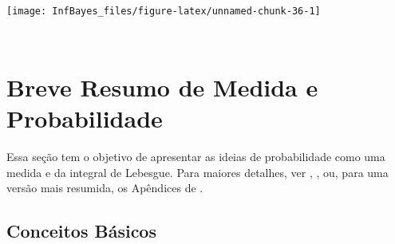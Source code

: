 \documentclass[
]{book}
\begin{document}
\begin{center}\texttt{[image: InfBayes\_files/figure-latex/unnamed-chunk-36-1]} \end{center}

\(~\)

\(~\)

\hypertarget{appendix-apuxeandice}{%
\appendix}


\hypertarget{medprob}{%
\chapter{Breve Resumo de Medida e Probabilidade}\label{medprob}}

Essa seção tem o objetivo de apresentar as ideias de probabilidade como uma medida e da integral de Lebesgue. Para maiores detalhes, ver \citet{Ash00}, \citet{Billingsley86}, \citet{Shiryaev96} ou, para uma versão mais resumida, os Apêndices de \citet{Schervish12}.

\hypertarget{basprob}{%
\section{Conceitos Básicos}\label{basprob}}
\end{document}
